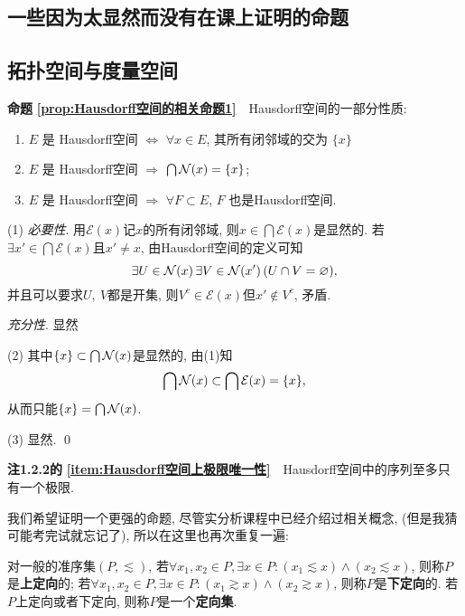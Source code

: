 
\begin{appendix}
	
	\chapter{一些因为太显然而没有在课上证明的命题}
	
	\section{拓扑空间与度量空间}
	
	\textbf{命题\,\,\ref{prop:Hausdorff空间的相关命题1}}\ \ Hausdorff空间的一部分性质:
	\begin{enumerate}[(1)]
		\item  $ E $ 是 Hausdorff空间 $ \Longleftrightarrow $ $ \forall x\in E $, 其所有闭邻域的交为 $\{ x \}$
	    \item $ E $ 是 Hausdorff空间 $ \Longrightarrow $ $\bigcap \mathcal{N}(x)=\{x\}$;
	    \item $ E $ 是 Hausdorff空间 $ \Longrightarrow $ $ \forall F\subset E $, $ F $ 也是Hausdorff空间. 
	\end{enumerate}
	\begin{Proof}
	(1) \textsl{必要性}. 用$ \mathcal{E}(x) $记$ x $的所有闭邻域, 则$ x\in\bigcap\mathcal{E}(x) $是显然的. 若$ \exists x'\in\bigcap\mathcal{E}(x) $且$ x'\ne x $, 由Hausdorff空间的定义可知
	\[
	\exists U\in\mathcal{N}({x})\,\exists V\in\mathcal{N}({x'})\,(U\cap V=\varnothing),
	\]
	并且可以要求$ U,\ V $都是开集, 则$ V^c\in\mathcal{E}(x) $但$ x'\notin V^c $, 矛盾.
	
	\textsl{充分性}. 显然
	
	(2) 其中$ \{x\}\subset\bigcap\mathcal{N}({x}) $是显然的, 由(1)知
	\[
	\bigcap\mathcal{N}(x)\subset\bigcap\mathcal{E}(x)=\{x\},
	\]
	从而只能$ \{x\}=\bigcap\mathcal{N}({x}) $.
	
	(3) 显然.	\qed
	\end{Proof}
	
	\textbf{注1.2.2的\,\,\ref{item:Hausdorff空间上极限唯一性}}\ \ Hausdorff空间中的序列至多只有一个极限.
	
	我们希望证明一个更强的命题, 尽管实分析课程中已经介绍过相关概念, (但是我猜可能考完试就忘记了), 所以在这里也再次重复一遍:
	\begin{Definition}
		对一般的准序集$ (P, \lesssim) $, 若$ \forall x_1, x_2\in P, \exists x\in P : (x_1\lesssim x)\land (x_2\lesssim x) $, 则称$ P $是\textbf{上定向}的; 若$ \forall x_1, x_2\in P, \exists x\in P : (x_1\gtrsim x)\land (x_2\gtrsim x) $, 则称$ P $是\textbf{下定向}的. 若$ P $上定向或者下定向, 则称$ P $是一个\textbf{定向集}.
		

\end{Definition}
\end{appendix}
